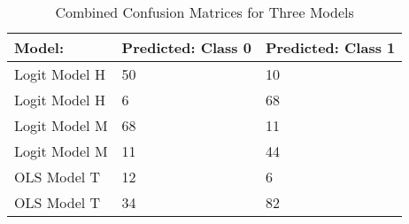\begin{table}[ht]
\centering
\begin{tabular}{lll}
  \hline
Model: & Predicted: Class 0 & Predicted: Class 1 \\ 
  \hline
Logit Model H & 50 & 10 \\ 
  Logit Model H & 6 & 68 \\ 
  Logit Model M & 68 & 11 \\ 
  Logit Model M & 11 & 44 \\ 
  OLS Model T & 12 & 6 \\ 
  OLS Model T & 34 & 82 \\ 
   \hline
\end{tabular}
\caption{Combined Confusion Matrices for Three Models} 
\label{tab:combined_confusion_matrices_01}
\end{table}

